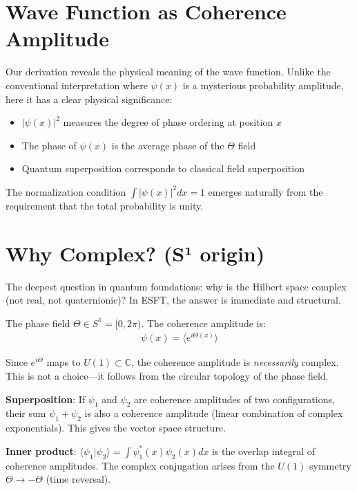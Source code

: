 ﻿\documentclass[twocolumn,showpacs,preprintnumbers,amsmath,amssymb,prd]{revtex4-2}
\begin{document}
\section{Wave Function as Coherence Amplitude}

Our derivation reveals the physical meaning of the wave function. Unlike the conventional interpretation where $\psi(x)$ is a mysterious probability amplitude, here it has a clear physical significance:

\begin{itemize}
\item $|\psi(x)|^2$ measures the degree of phase ordering at position $x$
\item The phase of $\psi(x)$ is the average phase of the $\Theta$ field
\item Quantum superposition corresponds to classical field superposition
\end{itemize}

The normalization condition $\int |\psi(x)|^2 dx = 1$ emerges naturally from the requirement that the total probability is unity.

\section{Why Complex? (S¹ origin)}

The deepest question in quantum foundations: why is the Hilbert space complex (not real, not quaternionic)? In ESFT, the answer is immediate and structural.

The phase field $\Theta \in S^1 = [0, 2\pi)$. The coherence amplitude is:
\begin{align}
\psi(x) = \langle e^{i\Theta(x)}\rangle
\end{align}

Since $e^{i\Theta}$ maps to $U(1) \subset \mathbb{C}$, the coherence amplitude is \emph{necessarily} complex. This is not a choice---it follows from the circular topology of the phase field.

\textbf{Superposition}: If $\psi_1$ and $\psi_2$ are coherence amplitudes of two configurations, their sum $\psi_1 + \psi_2$ is also a coherence amplitude (linear combination of complex exponentials). This gives the vector space structure.

\textbf{Inner product}: $\langle\psi_1|\psi_2\rangle = \int \psi_1^*(x) \psi_2(x) dx$ is the overlap integral of coherence amplitudes. The complex conjugation arises from the $U(1)$ symmetry $\Theta \to -\Theta$ (time reversal).
\end{document}

